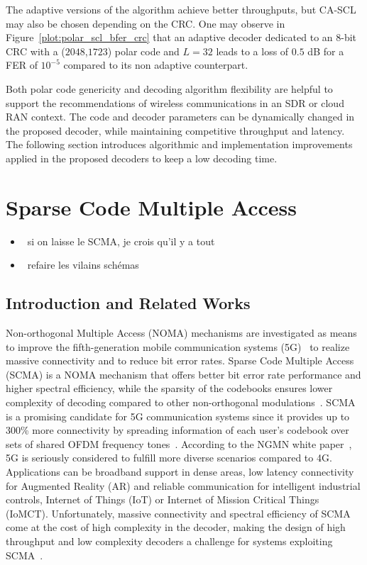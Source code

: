 The adaptive versions of the algorithm achieve better throughputs, but CA-SCL
may also be chosen depending on the CRC. One may observe in
Figure~\ref{plot:polar_scl_bfer_crc} that an adaptive decoder dedicated to an
8-bit CRC with a ($2048$,$1723$) polar code and $L=32$ leads to a loss of $0.5$
dB for a FER of $10^{-5}$ compared to its non adaptive counterpart.

Both polar code genericity and decoding algorithm flexibility are helpful to
support the recommendations of wireless communications in an SDR or cloud RAN
context. The code and decoder parameters can be dynamically changed in the
proposed decoder, while maintaining competitive throughput and latency. The
following section introduces algorithmic and implementation improvements applied
in the proposed decoders to keep a low decoding time.

\section{Sparse Code Multiple Access}

\begin{itemize}
  \item \cmark~si on laisse le SCMA, je crois qu'il y a tout
  \item \cmark~refaire les vilains schémas
\end{itemize}

\subsection{Introduction and Related Works}

Non-orthogonal Multiple Access (NOMA) mechanisms are investigated as means to
improve the fifth-generation mobile communication systems (5G)~\cite{Islam2017}
to realize massive connectivity and to reduce bit error rates. Sparse Code
Multiple Access (SCMA) is a NOMA mechanism that offers better bit error rate
performance and higher spectral efficiency, while the sparsity of the codebooks
ensures lower complexity of decoding compared to other non-orthogonal
modulations~\cite{Nikopour2013}. SCMA is a promising candidate for 5G
communication systems since it provides up to 300\% more connectivity by
spreading information of each user's codebook over sets of shared OFDM frequency
tones~\cite{Altera2015}. According to the NGMN white paper~\cite{Alliance2015},
5G is seriously considered to fulfill more diverse scenarios compared to 4G.
Applications can be broadband support in dense areas, low latency connectivity
for Augmented Reality (AR) and reliable communication for intelligent industrial
controls, Internet of Things (IoT) or Internet of Mission Critical Things
(IoMCT). Unfortunately, massive connectivity and spectral efficiency of SCMA
come at the cost of high complexity in the decoder, making the design of high
throughput and low complexity decoders a challenge for systems exploiting
SCMA~\cite{Lu2015}.

